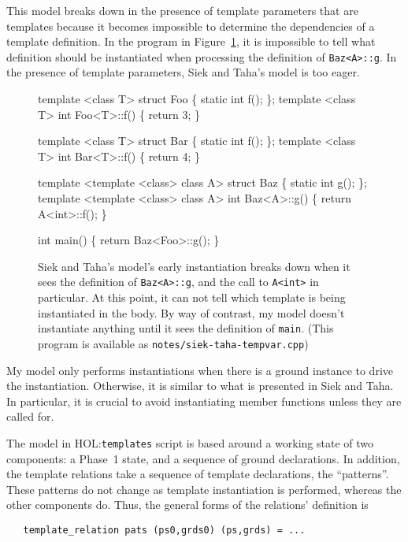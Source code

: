 \documentclass[11pt]{article}
\newcommand{\HOLfile}[1]{HOL:\texttt{#1}}
\begin{document}
This model breaks down in the presence of template parameters that are
templates because it becomes impossible to determine the dependencies
of a template definition.  In the program in
Figure~\ref{fig:taha-problem}, it is impossible to tell what
definition should be instantiated when processing the definition of
\texttt{Baz<A>::g}.  In the presence of template parameters, Siek and
Taha's model is too eager.

\begin{figure}
\begin{stdrule}
   template <class T> struct Foo \{ static int f(); \};
   template <class T> int Foo<T>::f() \{ return 3; \}

   template <class T> struct Bar \{ static int f(); \};
   template <class T> int Bar<T>::f() \{ return 4; \}

   template <template <class> class A> struct Baz \{
     static int g();
   \};
   template <template <class> class A>
   int Baz<A>::g() \{
     return A<int>::f();
   \}

   int main() \{ return Baz<Foo>::g(); \}
\end{stdrule}
  \caption[A Template Program that Breaks Siek and Taha's Model]{Siek
    and Taha's model's early instantiation breaks down when it sees
    the definition of \texttt{Baz<A>::g}, and the call to
    \texttt{A<int>} in particular.  At this point, it can not tell
    which template is being instantiated in the body.  By way of
    contrast, my model doesn't instantiate anything until it sees the
    definition of \texttt{main}.  (This program is available as
    \texttt{notes/siek-taha-tempvar.cpp})}
\label{fig:taha-problem}
\end{figure}

My model only performs instantiations when there is a ground instance
to drive the instantiation.  Otherwise, it is similar to what is
presented in Siek and Taha.  In particular, it is crucial to avoid
instantiating member functions unless they are called for.

The model in \HOLfile{templates} script is based around a working
state of two components: a Phase~1 state, and a sequence of ground
declarations.  In addition, the template relations take a sequence of
template declarations, the ``patterns''.  These patterns do not change
as template instantiation is performed, whereas the other components
do.  Thus, the general forms of the relations' definition is
\begin{verbatim}
   template_relation pats (ps0,grds0) (ps,grds) = ...
\end{verbatim}
\end{document}
